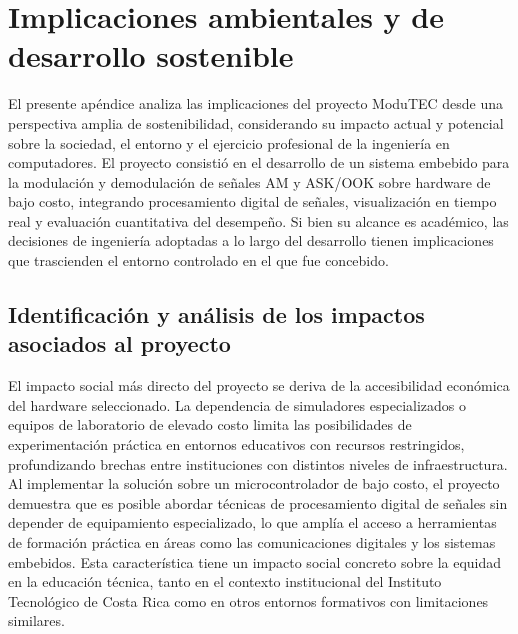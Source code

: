 
\appendix
\chapter{Implicaciones ambientales y de desarrollo sostenible}
\label{apx:sostenibilidad}

El presente apéndice analiza las implicaciones del proyecto ModuTEC
desde una perspectiva amplia de sostenibilidad, considerando su impacto
actual y potencial sobre la sociedad, el entorno y el ejercicio
profesional de la ingeniería en computadores. El proyecto consistió en
el desarrollo de un sistema embebido para la modulación y demodulación
de señales AM y ASK/OOK sobre hardware de bajo costo, integrando
procesamiento digital de señales, visualización en tiempo real y
evaluación cuantitativa del desempeño. Si bien su alcance es académico,
las decisiones de ingeniería adoptadas a lo largo del desarrollo tienen
implicaciones que trascienden el entorno controlado en el que fue
concebido.

\section{Identificación y análisis de los impactos asociados al proyecto}

El impacto social más directo del proyecto se deriva de la accesibilidad
económica del hardware seleccionado. La dependencia de simuladores
especializados o equipos de laboratorio de elevado costo limita las
posibilidades de experimentación práctica en entornos educativos con
recursos restringidos, profundizando brechas entre instituciones con
distintos niveles de infraestructura. Al implementar la solución sobre
un microcontrolador de bajo costo, el proyecto demuestra que es posible
abordar técnicas de procesamiento digital de señales sin depender de
equipamiento especializado, lo que amplía el acceso a herramientas de
formación práctica en áreas como las comunicaciones digitales y los
sistemas embebidos. Esta característica tiene un impacto social concreto
sobre la equidad en la educación técnica, tanto en el contexto
institucional del Instituto Tecnológico de Costa Rica como en otros
entornos formativos con limitaciones similares.

